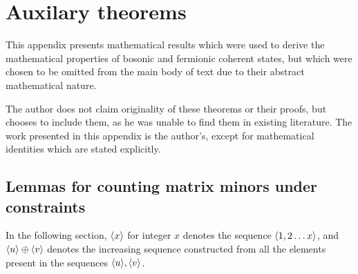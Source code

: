 \chapter{Auxilary theorems}
This appendix presents mathematical results which were used to derive the mathematical properties of bosonic and fermionic coherent states, but which were chosen to be omitted from the main body of text due to their abstract mathematical nature.

The author does not claim originality of these theorems or their proofs, but chooses to include them, as he was unable to find them in existing literature. The work presented in this appendix is the author's, except for mathematical identities which are stated explicitly.

\section{Lemmas for counting matrix minors under constraints}
In the following section, $\langle x\rangle$ for integer $x$ denotes the sequence $\langle 1,2\dots x\rangle$, and $\langle u\rangle\oplus\langle v\rangle$ denotes the increasing sequence constructed from all the elements present in the sequences $\langle u\rangle, \langle v\rangle$.

